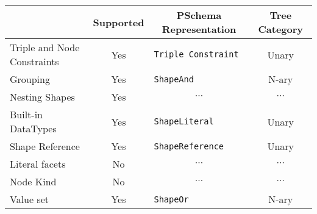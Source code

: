 \begin{table}[ht]
    \centering
    \begin{tabular}{|l|c|l|c|}
        \hline
        \rowcolor[HTML]{EFEFEF}
        \multicolumn{1}{|c|}{\cellcolor[HTML]{EFEFEF}\textbf{Feature}} & \textbf{Supported}         & \multicolumn{1}{c|}{\cellcolor[HTML]{EFEFEF}\textbf{PSchema Representation}} & \multicolumn{1}{c|}{\cellcolor[HTML]{EFEFEF}\textbf{Tree Category}} \\ \hline
        Triple and Node Constraints                                    & {\color[HTML]{009901} Yes} & \texttt{Triple Constraint}                                                   & Unary                                                               \\ \hline
        Grouping                                                       & {\color[HTML]{009901} Yes} & \texttt{ShapeAnd}                                                            & N-ary                                                               \\ \hline
        Nesting Shapes                                                 & {\color[HTML]{009901} Yes} & \multicolumn{1}{c|}{$\cdots$}                                                & \multicolumn{1}{c|}{$\cdots$}                                       \\ \hline
        Built-in DataTypes                                             & {\color[HTML]{009901} Yes} & \texttt{ShapeLiteral}                                                        & Unary                                                               \\ \hline
        Shape Reference                                                & {\color[HTML]{009901} Yes} & \texttt{ShapeReference}                                                      & Unary                                                               \\ \hline
        Literal facets                                                 & {\color[HTML]{FE0000} No}  & \multicolumn{1}{c|}{$\cdots$}                                                & \multicolumn{1}{c|}{$\cdots$}                                       \\ \hline
        Node Kind                                                      & {\color[HTML]{FE0000} No}  & \multicolumn{1}{c|}{$\cdots$}                                                & \multicolumn{1}{c|}{$\cdots$}                                       \\ \hline
        Value set                                                      & {\color[HTML]{009901} Yes} & \texttt{ShapeOr}                                                             & N-ary                                                               \\ \hline

\end{tabular}
\end{table}
